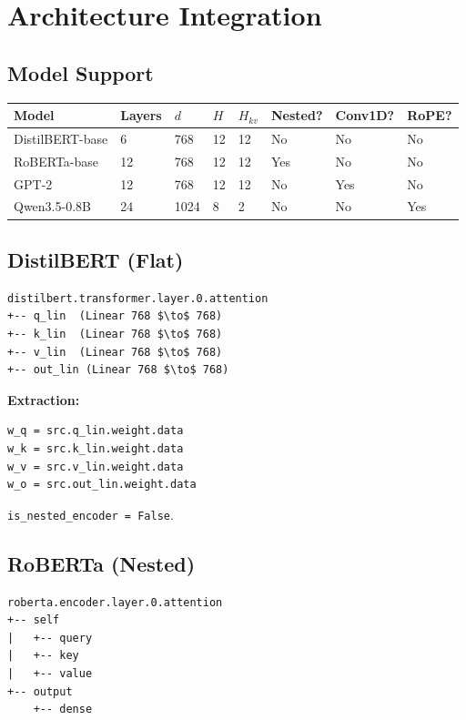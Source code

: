 
\section{Architecture Integration}

\subsection{Model Support}

\begin{table}[H]
\centering
\small
\begin{tabular}{llllllll}
\toprule
\textbf{Model} & \textbf{Layers} & \textbf{$d$} & \textbf{$H$} & \textbf{$H_{kv}$} & \textbf{Nested?} & \textbf{Conv1D?} & \textbf{RoPE?} \\
\midrule
DistilBERT-base & 6 & 768 & 12 & 12 & No & No & No \\
RoBERTa-base & 12 & 768 & 12 & 12 & Yes & No & No \\
GPT-2 & 12 & 768 & 12 & 12 & No & Yes & No \\
Qwen3.5-0.8B & 24 & 1024 & 8 & 2 & No & No & Yes \\
\bottomrule
\end{tabular}
\end{table}

\subsection{DistilBERT (Flat)}

\begin{lstlisting}
distilbert.transformer.layer.0.attention
+-- q_lin  (Linear 768 $\to$ 768)
+-- k_lin  (Linear 768 $\to$ 768)
+-- v_lin  (Linear 768 $\to$ 768)
+-- out_lin (Linear 768 $\to$ 768)
\end{lstlisting}

\textbf{Extraction:}
\begin{lstlisting}
w_q = src.q_lin.weight.data
w_k = src.k_lin.weight.data
w_v = src.v_lin.weight.data
w_o = src.out_lin.weight.data
\end{lstlisting}

\texttt{is\_nested\_encoder = False}.

\subsection{RoBERTa (Nested)}

\begin{lstlisting}
roberta.encoder.layer.0.attention
+-- self
|   +-- query
|   +-- key
|   +-- value
+-- output
    +-- dense
\end{lstlisting}

